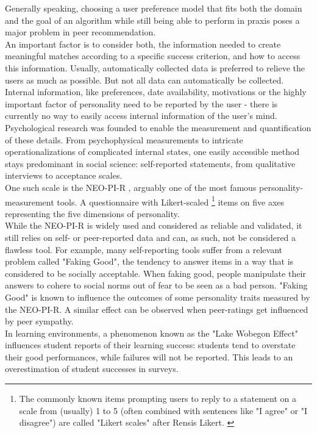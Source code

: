 \documentclass[conference]{IEEEtran}
\begin{document}
Generally speaking, choosing a user preference model that fits both the domain and the goal of an algorithm while still being able to perform in praxis poses a major problem in peer recommendation. \cite{potts2018reciprocal, olakanmi2017group}\\
An important factor is to consider both, the information needed to create meaningful matches according to a specific success criterion, and how to access this information. Usually, automatically collected data is preferred to relieve the users as much as possible. But not all data can automatically be collected. Internal information, like preferences, date availability, motivations or the highly important factor of personality need to be reported by the user - there is currently no way to easily access internal information of the user's mind.\\
Psychological research was founded to enable the measurement and quantification of these details. From psychophysical measurements to intricate operationalizations of complicated internal states, one easily accessible method stays predominant in social science: self-reported statements, from qualitative interviews to acceptance scales.\\
One such scale is the NEO-PI-R \cite{ostendorf2004neo}, arguably one of the most famous personality-measurement tools. A questionnaire with Likert-scaled \footnote{The commonly known items prompting users to reply to a statement on a scale from (usually) 1 to 5 (often combined with sentences like "I agree" or "I disagree") are called "Likert scales" after Rensis Likert. \cite{likert1932technique}} items on five axes representing the five dimensions of personality. \cite{mccrae1987validation, goldberg1990alternative}\\
While the NEO-PI-R is widely used and considered as reliable and validated, it still relies on self- or peer-reported data and can, as such, not be considered a flawless tool. For example, many self-reporting tools suffer from a relevant problem called "Faking Good", the tendency to answer items in a way that is considered to be socially acceptable. When faking good, people manipulate their answers to cohere to social norms out of fear to be seen as a bad person. "Faking Good" is known to influence the outcomes of some personality traits measured by the NEO-PI-R.\cite{griffin2004applicants} A similar effect can be observed when peer-ratings get influenced by peer sympathy. \cite{leising2010letter}\\
In learning environments, a phenomenon known as the "Lake Wobegon Effect" influences student reports of their learning success: students tend to overstate their good performances, while failures will not be reported. This leads to an overestimation of student successes in surveys. \cite{maxwell1994lake}\\
\end{document}
